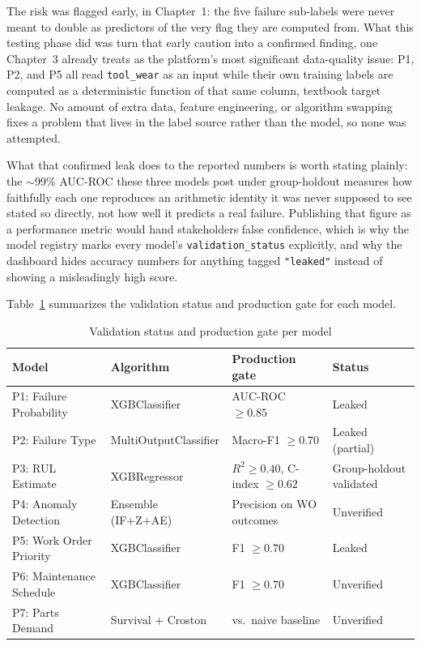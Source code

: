 The risk was flagged early, in Chapter~1: the five failure sub-labels were never meant to double as predictors of the very flag they are computed from. What this testing phase did was turn that early caution into a confirmed finding, one Chapter~3 already treats as the platform's most significant data-quality issue: P1, P2, and P5 all read \texttt{tool\_wear} as an input while their own training labels are computed as a deterministic function of that same column, textbook target leakage. No amount of extra data, feature engineering, or algorithm swapping fixes a problem that lives in the label source rather than the model, so none was attempted.

What that confirmed leak does to the reported numbers is worth stating plainly: the $\sim$99\% AUC-ROC these three models post under group-holdout measures how faithfully each one reproduces an arithmetic identity it was never supposed to see stated so directly, not how well it predicts a real failure. Publishing that figure as a performance metric would hand stakeholders false confidence, which is why the model registry marks every model's \texttt{validation\_status} explicitly, and why the dashboard hides accuracy numbers for anything tagged \texttt{"leaked"} instead of showing a misleadingly high score.

Table~\ref{tab:validation-status} summarizes the validation status and production gate for each model.

\begin{table}[h]
\centering
\begin{tabularx}{\textwidth}{|X|X|X|X|}
\toprule
\textbf{Model} & \textbf{Algorithm} & \textbf{Production gate} & \textbf{Status} \\
\midrule
P1: Failure Probability   & XGBClassifier         & AUC-ROC $\geq 0.85$            & Leaked \\
\midrule
P2: Failure Type          & MultiOutputClassifier & Macro-F1 $\geq 0.70$           & Leaked (partial) \\
\midrule
P3: RUL Estimate          & XGBRegressor          & $R^2 \geq 0.40$, C-index $\geq 0.62$ & Group-holdout validated \\
\midrule
P4: Anomaly Detection     & Ensemble (IF+Z+AE)    & Precision on WO outcomes       & Unverified \\
\midrule
P5: Work Order Priority   & XGBClassifier         & F1 $\geq 0.70$                 & Leaked \\
\midrule
P6: Maintenance Schedule  & XGBClassifier         & F1 $\geq 0.70$                 & Unverified \\
\midrule
P7: Parts Demand          & Survival + Croston    & vs.\ naive baseline            & Unverified \\
\bottomrule
\end{tabularx}
\caption{Validation status and production gate per model}
\label{tab:validation-status}
\end{table}

